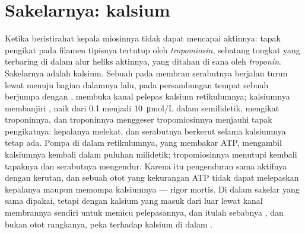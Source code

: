 \section{Sakelarnya: kalsium}

\begin{proposition}\label{prop:b2:muscle-movement:coupling}
Ketika beristirahat kepala miosinnya tidak dapat mencapai aktinnya:
tapak pengikat pada filamen tipisnya tertutup oleh \emph{tropomiosin},
sebatang tongkat yang terbaring di dalam alur heliks aktinnya, yang
ditahan di sana oleh \emph{troponin}. Sakelarnya adalah kalsium. Sebuah
 pada membran serabutnya berjalan turun lewat  menuju bagian dalamnya lalu, pada persambungan tempat sebuah
 berjumpa dengan , membuka kanal
pelepas kalsium retikulumnya; kalsiumnya membanjiri , naik
dari \qty{0.1}{} menjadi \qty{10}{\micro mol/L} dalam semilidetik,
mengikat troponinnya, dan troponinnya menggeser tropomiosinnya menjauhi
tapak pengikatnya: kepalanya melekat, dan serabutnya berkerut selama
kalsiumnya tetap ada. Pompa di dalam retikulumnya, yang membakar ATP,
mengambil kalsiumnya kembali dalam puluhan milidetik; tropomiosinnya
menutupi kembali tapaknya dan serabutnya mengendur. Karena itu
pengenduran sama aktifnya dengan kerutan, dan sebuah otot yang
kekurangan ATP tidak dapat melepaskan kepalanya maupun memompa
kalsiumnya --- rigor mortis. Di dalam  sakelar yang sama
dipakai, tetapi dengan kalsium yang masuk dari luar lewat kanal
membrannya sendiri untuk memicu pelepasannya, dan itulah sebabnya
, dan bukan otot rangkanya, peka terhadap kalsium di dalam
.
\end{proposition}

